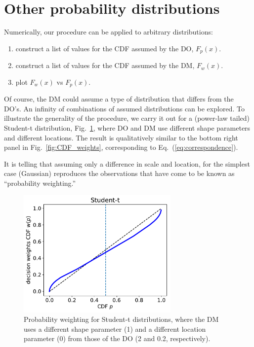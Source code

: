 \documentclass[11pt]{article}
\newcommand{\eref}[1]{Eq.~(\ref{eq:#1})}
\newcommand{\flabel}[1]{\label{fig:#1}}
\newcommand{\fref}[1]{Fig.~\ref{fig:#1}}
\numberwithin{equation}{section}
\begin{document}
\section{Other probability distributions}
Numerically, our procedure can be applied to arbitrary distributions: 
\begin{enumerate}
\item
construct a list of values for the CDF assumed by the DO, $F_p(x)$.
\item
construct a list of values for the CDF assumed by the DM, $F_w(x)$.
\item
plot $F_w(x)$ vs $F_p(x)$.
\end{enumerate}
Of course, the DM could assume a type of distribution that differs from the DO's. An infinity of combinations of assumed distributions can be explored. To illustrate the generality of the procedure, we carry it out for a (power-law tailed) Student-t distribution, \fref{other_CDFs}, where DO and DM use different shape parameters and different locations. The result is qualitatively similar to the bottom right panel in \fref{CDF_weights}, corresponding to \eref{correspondence}. 

It is telling that assuming only a difference in scale and location, for the simplest case (Gaussian) reproduces the observations that have come to be known as ``probability weighting.''

\begin{figure}
\centering
\includegraphics[width=0.7\textwidth]{./figs/Student-t.pdf}
\caption{Probability weighting for Student-t distributions, where the DM uses a different shape parameter (1) and a different location parameter (0) from those of the DO (2 and 0.2, respectively).}
\flabel{other_CDFs}
\end{figure}

\clearpage
%
\end{document}
